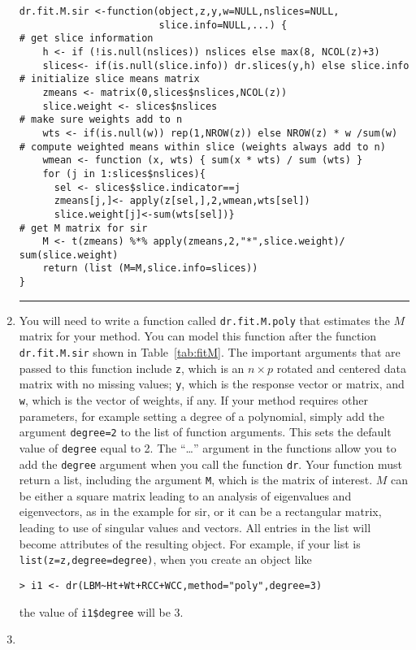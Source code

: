\documentclass{article}
\newcommand{\dcode}[1]{{\small{\tt #1}}}
\newcommand{\ir}{{\tt dr}}
\newcommand{\sir}{{\sffamily sir}}
\begin{document}
\begin{enumerate}
\begin{table}
\begin{verbatim}
dr.fit.M.sir <-function(object,z,y,w=NULL,nslices=NULL,
                        slice.info=NULL,...) {
# get slice information
    h <- if (!is.null(nslices)) nslices else max(8, NCOL(z)+3)
    slices<- if(is.null(slice.info)) dr.slices(y,h) else slice.info
# initialize slice means matrix
    zmeans <- matrix(0,slices$nslices,NCOL(z))
    slice.weight <- slices$nslices
# make sure weights add to n
    wts <- if(is.null(w)) rep(1,NROW(z)) else NROW(z) * w /sum(w)
# compute weighted means within slice (weights always add to n)
    wmean <- function (x, wts) { sum(x * wts) / sum (wts) }
    for (j in 1:slices$nslices){
      sel <- slices$slice.indicator==j
      zmeans[j,]<- apply(z[sel,],2,wmean,wts[sel])
      slice.weight[j]<-sum(wts[sel])}
# get M matrix for sir
    M <- t(zmeans) %*% apply(zmeans,2,"*",slice.weight)/ sum(slice.weight)
    return (list (M=M,slice.info=slices))
}
\end{verbatim}
\hrule
\normalsize
\end{table}
\item
You will need to write a function called \dcode{dr.fit.M.poly}
that estimates the $M$ matrix for your method.  You can model this
function after the function \dcode{dr.fit.M.sir} shown in
Table~\ref{tab:fitM}.  The important arguments that are passed to
this function include \dcode{z}, which is an $n \times p$ rotated
and centered data matrix with no missing values; \dcode{y}, which
is the response vector or matrix, and \dcode{w}, which is the
vector of weights, if any.  If your method requires other
parameters, for example setting a degree of a polynomial, simply
add the argument
\dcode{degree=2} to the list of function arguments.  This sets the
default value of \dcode{degree} equal to 2.  The ``\ldots''
argument in the functions allow you to add the \dcode{degree}
argument when you call the function \ir.  Your function must
return a list, including the argument \dcode{M}, which is the
matrix of interest. $M$ can be either a square matrix leading to
an analysis of eigenvalues and eigenvectors, as in the example for
\sir, or it can be a rectangular matrix, leading to use of
singular values and vectors.  All entries in the list will become
attributes of the resulting object.  For example, if your list is
\dcode{list(z=z,degree=degree)}, when you create an object like
\small
\begin{verbatim}
> i1 <- dr(LBM~Ht+Wt+RCC+WCC,method="poly",degree=3)
\end{verbatim}
\normalsize
the value of \dcode{i1\$degree} will be 3.
\item

\end{enumerate}
\end{document}

